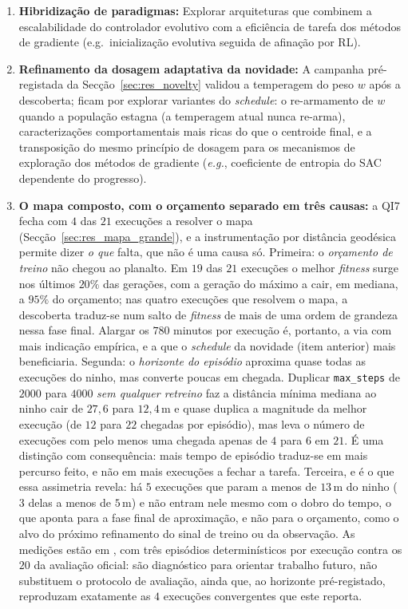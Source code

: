 \documentclass[12pt,reqno, twoside]{amsbook}
\theoremstyle{plain}
\numberwithin{equation}{chapter}
\numberwithin{section}{chapter}
\numberwithin{table}{chapter}
\numberwithin{figure}{chapter}
\begin{document}
\begin{enumerate}
    \item \textbf{Hibridização de paradigmas:} Explorar arquiteturas que combinem a escalabilidade do controlador evolutivo com a eficiência de tarefa dos métodos de gradiente (e.g.\ inicialização evolutiva seguida de afinação por RL).
    \item \textbf{Refinamento da dosagem adaptativa da novidade:} A campanha pré-registada da Secção~\ref{sec:res_novelty} validou a temperagem do peso $w$ após a descoberta; ficam por explorar variantes do \emph{schedule}: o re-armamento de $w$ quando a população estagna (a temperagem atual nunca re-arma), caracterizações comportamentais mais ricas do que o centroide final, e a transposição do mesmo princípio de dosagem para os mecanismos de exploração dos métodos de gradiente (\textit{e.g.}, coeficiente de entropia do SAC dependente do progresso).
    \item \textbf{O mapa composto, com o orçamento separado em três causas:} a QI7 fecha com $4$ das $21$ execuções a resolver o mapa (Secção~\ref{sec:res_mapa_grande}), e a instrumentação por distância geodésica permite dizer \emph{o que} falta, que não é uma causa só. Primeira: o \emph{orçamento de treino} não chegou ao planalto. Em $19$ das $21$ execuções o melhor \textit{fitness} surge nos últimos $20\%$ das gerações, com a geração do máximo a cair, em mediana, a $95\%$ do orçamento; nas quatro execuções que resolvem o mapa, a descoberta traduz-se num salto de \textit{fitness} de mais de uma ordem de grandeza nessa fase final. Alargar os $780$ minutos por execução é, portanto, a via com mais indicação empírica, e a que o \emph{schedule} da novidade (item anterior) mais beneficiaria. Segunda: o \emph{horizonte do episódio} aproxima quase todas as execuções do ninho, mas converte poucas em chegada. Duplicar \texttt{max\_steps} de $2000$ para $4000$ \emph{sem qualquer retreino} faz a distância mínima mediana ao ninho cair de $27{,}6$ para $12{,}4$\,m e quase duplica a magnitude da melhor execução (de $12$ para $22$ chegadas por episódio), mas leva o número de execuções com pelo menos uma chegada apenas de $4$ para $6$ em $21$. É uma distinção com consequência: mais tempo de episódio traduz-se em mais percurso feito, e não em mais execuções a fechar a tarefa. Terceira, e é o que essa assimetria revela: há $5$ execuções que param a menos de $13$\,m do ninho ($3$ delas a menos de $5$\,m) e não entram nele mesmo com o dobro do tempo, o que aponta para a fase final de aproximação, e não para o orçamento, como o alvo do próximo refinamento do sinal de treino ou da observação. As medições estão em , com três episódios determinísticos por execução contra os $20$ da avaliação oficial: são diagnóstico para orientar trabalho futuro, não substituem o protocolo de avaliação, ainda que, ao horizonte pré-registado, reproduzam exatamente as $4$ execuções convergentes que este reporta.

\end{enumerate}
\end{document}
